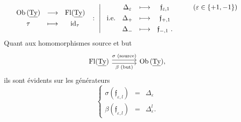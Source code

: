 \[
\begin{array}{ccc}
\mathrm{Ob}\,(\underline{\mathrm{Ty}}) & \longrightarrow & \mathrm{Fl}(\underline{\mathrm{Ty}})\\[4pt]
\tau & \longmapsto & \mathrm{id}_\tau
\end{array}
\ :\
\left|\
\begin{array}{rcccl}
 & \Delta_\varepsilon & \longmapsto & \mathfrak{f}_{\varepsilon,1} & \qquad(\varepsilon\in\{+1,-1\})\\[4pt]
\text{i.e.} & \Delta_+ & \longmapsto & \mathfrak{f}_{+,1} & \\[4pt]
 & \Delta_- & \longmapsto & \mathfrak{f}_{-,1}\ . &
\end{array}
\right.
\]
Quant aux homomorphismes source et but
\[
\begin{tikzcd}[column sep=large]
\mathrm{Fl}(\uTy) \arrow[r, shift left, "\sigma\text{ (source)}"] \arrow[r, shift right, "\beta\text{ (but)}"'] & \mathrm{Ob}\,(\uTy),
\end{tikzcd}
\]
ils sont évidents sur les générateurs
\[
\left\{
\begin{array}{lcl}
\sigma(\mathfrak{f}_{\varepsilon,l}) & = & \Delta_\varepsilon\\[4pt]
\beta(\mathfrak{f}_{\varepsilon,l}) & = & \Delta^l_\varepsilon.
\end{array}
\right.
\]

